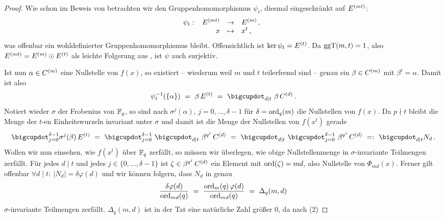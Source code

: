 \begin{proof}
  Wie schon im Beweis von
   betrachten wir
  den Gruppenhomomorphismus $\psi_t$, diesmal eingeschränkt auf $E^{(mt)}$:
  \[ \psi_t:\ \funcdef{E\kl{mt} & \to& E\kl m\,,\\
    x &\mapsto& x^t\,,}\]
  was offenbar ein wohldefinierter Gruppenhomomorphismus bleibt.
  Offensichtlich ist $\ker\psi_t = E^{(t)}$. Da $\operatorname{ggT}(m,t) = 1$, also 
  $E^{(mt)} = E^{(m)} \odot E^{(t)}$ als leichte Folgerung aus
  , ist $\psi$ auch surjektiv.

  Ist nun $\alpha \in C^{(m)}$ eine Nullstelle von $f(x)$, 
  so existiert -- wiederum
  weil $m$ und $t$ teilerfremd sind -- genau ein $\beta \in C^{(m)}$ mit
  $\beta^t = \alpha$. Damit ist also
  \[ \psi_t\inv(\{\alpha\}) \speq= \beta\, E\kl t \speq=
    \bigcupdot_{d\mid t}\ \beta\, C\kl d \,.\]
  Notiert wieder $\sigma$ der Frobenius von
  $\mathbb{F}_q$, so sind nach 
  $\sigma^j(\alpha)$, $j=0,\ldots,\delta-1$ für 
  $\delta=\operatorname{ord}_q(m)$ die Nullstellen von $f(x)$. Da $p\nmid t$ bleibt
  die Menge der $t$-en Einheitswurzeln invariant unter $\sigma $ und 
  damit ist die Menge der Nullstellen von $f(x^t)$ gerade
  \begin{equation}
    \bigcupdot_{j=0}^{\delta-1} \sigma^j(\beta)\, E\kl t \speq=
    \bigcupdot_{j=0}^{\delta-1}\ \bigcupdot_{d\mid t}\ \beta^{q^j}\, C\kl d
    \speq=
    \bigcupdot_{d\mid t}\ \bigcupdot_{j=0}^{\delta-1}\ \beta^{q^j}\, C\kl d
    \speq{=:} \bigcupdot_{d\mid t} N_d\,. 
  \end{equation}
  Wollen wir nun einsehen, wie $f(x^t)$ über $\mathbb{F}_q$ zerfällt, so müssen wir
  überlegen, wie obige Nullstellenmenge in $\sigma$-invariante Teilmengen
  zerfällt. Für jedes $d\mid t$ und jedes $j\in\{0,\ldots,\delta -1\}$ ist
  $\zeta \in \beta^{q^j}\,C^{(d)}$ ein Element mit $\operatorname{ord}(\zeta) = md$, also
  Nullstelle von $\Phi_{md}(x)$. Ferner gilt
  offenbar $\forall d\mid t:\ |N_d| = \delta\varphi(d)$
  und wir können folgern, dass $N_d$ in genau
  \[ \frac{\delta\varphi(d)}{\operatorname{ord}_{md}(q)} \ =\  \frac{\operatorname{ord}_m(q)\,
    \varphi(d)}{\operatorname{ord}_{md}(q)} \ =\ 
    \Delta_q(m,d)\]
  $\sigma$-invariante Teilmengen zerfällt. $\Delta_q(m,d)$ ist in der Tat eine
  natürliche Zahl größer 0, da nach  (2)

\end{proof}
